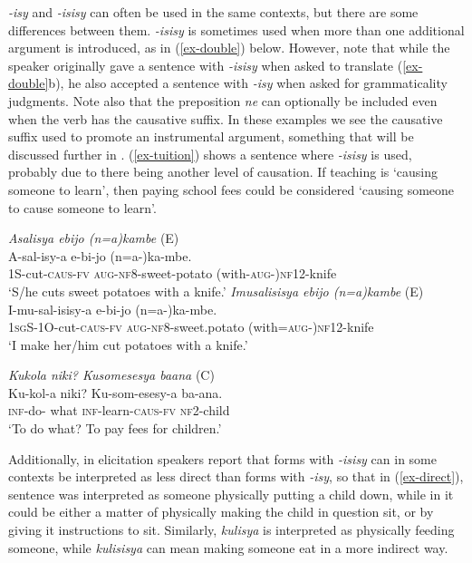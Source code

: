 \documentclass[output=paper,colorlinks,citecolor=brown,draftmode]{langscibook}
\begin{document}
\emph{-isy} and \emph{-isisy} can often be used in the same contexts, but there are some differences between them. \emph{-isisy} is sometimes used when more than one additional argument is introduced, as in (\ref{ex-double}) below. However, note that while the speaker originally gave a sentence with \emph{-isisy} when asked to translate (\ref{ex-double}b), he also accepted a sentence with \emph{-isy} when asked for grammaticality judgments. Note also that the preposition \emph{ne} can optionally be included even when the verb has the causative suffix. In these examples we see the causative suffix used to promote an instrumental argument, something that will be discussed further in . (\ref{ex-tuition}) shows a sentence where \emph{-isisy} is used, probably due to there being another level of causation. If teaching is `causing someone to learn', then paying school fees could be considered `causing someone to cause someone to learn'. 

\ea
\begin{xlist}   \label{ex-double}
 \ex \emph{Asalisya ebijo (n=a)kambe} (E) \\
  \gll  A-sal-isy-a 		e-bi-jo 		(n=a-)ka-mbe. \\ 
1S-cut-\textsc{caus-fv} \textsc{aug-nf8}-sweet-potato (with-\textsc{aug}-)\textsc{nf12}-knife\\
    \glt  `S/he cuts sweet potatoes with a knife.' 
     \ex \emph{Imusalisisya ebijo (n=a)kambe} (E) \\
  \gll  I-mu-sal-isisy-a 		e-bi-jo 		(n=a-)ka-mbe. \\ 
1\textsc{sg}S-1O-cut-\textsc{caus-fv} \textsc{aug-nf8}-sweet.potato (with=\textsc{aug-})\textsc{nf12}-knife \\
    \glt  `I make her/him cut potatoes with a knife.'
      \end{xlist}     
      \z

\ea\label{ex-tuition} \emph{Kukola niki? Kusomesesya baana} (C) \\
  \gll Ku-kol-a 	niki? Ku-som-esesy-a 		ba-ana.  \\ 
\textsc{inf}-do-\Fv{} what \textsc{inf}-learn-\textsc{caus-fv} \textsc{nf2}-child\\
    \glt  `To do what? To pay fees for children.' 
      \z

Additionally, in elicitation speakers report that forms with \emph{-isisy} can in some contexts be interpreted as less direct than forms with \emph{-isy}, so that in (\ref{ex-direct}), sentence  was interpreted as someone physically putting a child down, while in  it could be either a matter of physically making the child in question sit, or by giving it instructions to sit. Similarly, \emph{kulisya} is interpreted as physically feeding someone, while \emph{kulisisya} can mean making someone eat in a more indirect way.
\end{document}
